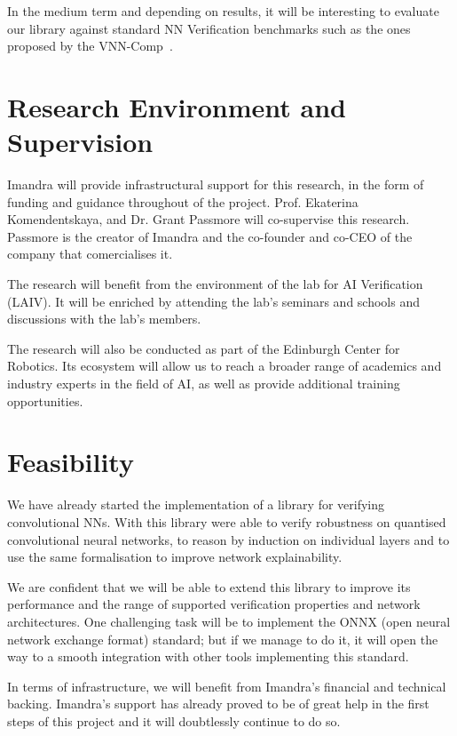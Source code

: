 \documentclass[]{article}
\begin{document}
In the medium term and depending on results, it will be interesting to evaluate our library against standard NN Verification benchmarks such as the ones proposed by the VNN-Comp~\cite{noauthor_vnn_nodate}.

\section{Research Environment and Supervision}

Imandra will provide infrastructural support for this research, in the form of funding and guidance throughout of the project.
Prof. Ekaterina Komendentskaya, and Dr. Grant Passmore will co-supervise this research. Passmore is the creator of Imandra and the co-founder and co-CEO of the company that comercialises it.

The research will benefit from the environment of the lab for AI Verification (LAIV). It will be enriched by attending the lab's seminars and schools and discussions with the lab's members.
 
The research will also be conducted as part of the Edinburgh Center for Robotics. Its ecosystem will allow us to reach a broader range of academics and industry experts in the field of AI, as well as provide additional training opportunities.


\section{Feasibility}
We have already started the implementation of a library for verifying convolutional NNs. With this library were able to verify robustness on quantised convolutional neural networks, to reason by induction on individual layers and to use the same formalisation to improve network explainability.

We are confident that we will be able to extend this library to improve its performance and the range of supported verification properties and network architectures. One challenging task will be to implement the ONNX (open neural network exchange format) standard; but if we manage to do it, it will open the way to a smooth integration with other tools implementing this standard. 

In terms of infrastructure, we will benefit from Imandra's financial and technical backing. Imandra's support has already proved to be of great help in the first steps of this project and it will doubtlessly continue to do so.
\end{document}
